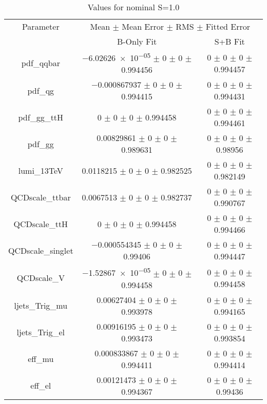 \begin{table}
\centering
\caption{Values for nominal S=1.0}
\begin{tabular}{ccc}
\toprule
Parameter & \multicolumn{2}{c}{Mean $\pm$ Mean Error $\pm$ RMS $\pm$ Fitted Error}\\
 & B-Only Fit & S+B Fit\\
\midrule
pdf\_qqbar & \num{-6.02626e-05} $\pm$ \num{0} $\pm$ \num{0} $\pm$ \num{0.994456} & \num{0} $\pm$ \num{0} $\pm$ \num{0} $\pm$ \num{0.994457}\\
pdf\_qg & \num{-0.000867937} $\pm$ \num{0} $\pm$ \num{0} $\pm$ \num{0.994415} & \num{0} $\pm$ \num{0} $\pm$ \num{0} $\pm$ \num{0.994431}\\
pdf\_gg\_ttH & \num{0} $\pm$ \num{0} $\pm$ \num{0} $\pm$ \num{0.994458} & \num{0} $\pm$ \num{0} $\pm$ \num{0} $\pm$ \num{0.994461}\\
pdf\_gg & \num{0.00829861} $\pm$ \num{0} $\pm$ \num{0} $\pm$ \num{0.989631} & \num{0} $\pm$ \num{0} $\pm$ \num{0} $\pm$ \num{0.98956}\\
lumi\_13TeV & \num{0.0118215} $\pm$ \num{0} $\pm$ \num{0} $\pm$ \num{0.982525} & \num{0} $\pm$ \num{0} $\pm$ \num{0} $\pm$ \num{0.982149}\\
QCDscale\_ttbar & \num{0.0067513} $\pm$ \num{0} $\pm$ \num{0} $\pm$ \num{0.982737} & \num{0} $\pm$ \num{0} $\pm$ \num{0} $\pm$ \num{0.990767}\\
QCDscale\_ttH & \num{0} $\pm$ \num{0} $\pm$ \num{0} $\pm$ \num{0.994458} & \num{0} $\pm$ \num{0} $\pm$ \num{0} $\pm$ \num{0.994466}\\
QCDscale\_singlet & \num{-0.000554345} $\pm$ \num{0} $\pm$ \num{0} $\pm$ \num{0.99406} & \num{0} $\pm$ \num{0} $\pm$ \num{0} $\pm$ \num{0.994447}\\
QCDscale\_V & \num{-1.52867e-05} $\pm$ \num{0} $\pm$ \num{0} $\pm$ \num{0.994458} & \num{0} $\pm$ \num{0} $\pm$ \num{0} $\pm$ \num{0.994458}\\
ljets\_Trig\_mu & \num{0.00627404} $\pm$ \num{0} $\pm$ \num{0} $\pm$ \num{0.993978} & \num{0} $\pm$ \num{0} $\pm$ \num{0} $\pm$ \num{0.994165}\\
ljets\_Trig\_el & \num{0.00916195} $\pm$ \num{0} $\pm$ \num{0} $\pm$ \num{0.993473} & \num{0} $\pm$ \num{0} $\pm$ \num{0} $\pm$ \num{0.993854}\\
eff\_mu & \num{0.000833867} $\pm$ \num{0} $\pm$ \num{0} $\pm$ \num{0.994411} & \num{0} $\pm$ \num{0} $\pm$ \num{0} $\pm$ \num{0.994414}\\
eff\_el & \num{0.00121473} $\pm$ \num{0} $\pm$ \num{0} $\pm$ \num{0.994367} & \num{0} $\pm$ \num{0} $\pm$ \num{0} $\pm$ \num{0.99436}\\

\end{tabular}
\end{table}
